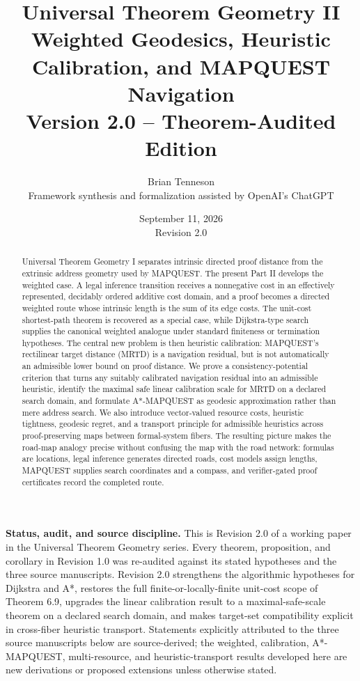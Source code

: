 \documentclass[11pt]{article}
\title{\textbf{Universal Theorem Geometry II}\\[4pt]\Large Weighted Geodesics, Heuristic Calibration, and MAPQUEST Navigation\\[5pt]\large Version 2.0 -- Theorem-Audited Edition}
\author{Brian Tenneson\\\small Framework synthesis and formalization assisted by OpenAI's ChatGPT}
\date{September 11, 2026\\Revision 2.0}
\theoremstyle{definition}
\theoremstyle{remark}
\begin{document}
\maketitle

\begin{abstract}
Universal Theorem Geometry I separates intrinsic directed proof distance from the extrinsic address geometry used by MAPQUEST. The present Part II develops the weighted case. A legal inference transition receives a nonnegative cost in an effectively represented, decidably ordered additive cost domain, and a proof becomes a directed weighted route whose intrinsic length is the sum of its edge costs. The unit-cost shortest-path theorem is recovered as a special case, while Dijkstra-type search supplies the canonical weighted analogue under standard finiteness or termination hypotheses. The central new problem is then heuristic calibration: MAPQUEST's rectilinear target distance (MRTD) is a navigation residual, but is not automatically an admissible lower bound on proof distance. We prove a consistency-potential criterion that turns any suitably calibrated navigation residual into an admissible heuristic, identify the maximal safe linear calibration scale for MRTD on a declared search domain, and formulate A*-MAPQUEST as geodesic approximation rather than mere address search. We also introduce vector-valued resource costs, heuristic tightness, geodesic regret, and a transport principle for admissible heuristics across proof-preserving maps between formal-system fibers. The resulting picture makes the road-map analogy precise without confusing the map with the road network: formulas are locations, legal inference generates directed roads, cost models assign lengths, MAPQUEST supplies search coordinates and a compass, and verifier-gated proof certificates record the completed route.
\end{abstract}

\noindent\textbf{Status, audit, and source discipline.} This is Revision 2.0 of a working paper in the Universal Theorem Geometry series. Every theorem, proposition, and corollary in Revision 1.0 was re-audited against its stated hypotheses and the three source manuscripts. Revision 2.0 strengthens the algorithmic hypotheses for Dijkstra and A*, restores the full finite-or-locally-finite unit-cost scope of Theorem 6.9, upgrades the linear calibration result to a maximal-safe-scale theorem on a declared search domain, and makes target-set compatibility explicit in cross-fiber heuristic transport. Statements explicitly attributed to the three source manuscripts below are source-derived; the weighted, calibration, A*-MAPQUEST, multi-resource, and heuristic-transport results developed here are new derivations or proposed extensions unless otherwise stated.
\end{document}
